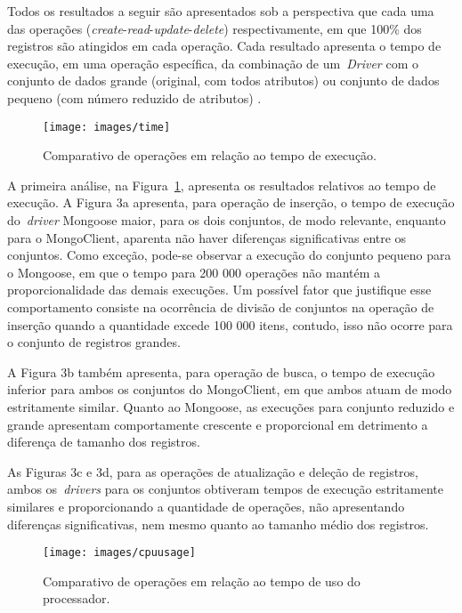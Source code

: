 \documentclass[12pt]{article}
\begin{document}
Todos os resultados a seguir são apresentados sob a perspectiva que cada uma das operações (\emph{create}-\emph{read}-\emph{update}-\emph{delete}) respectivamente, em que 100\% dos registros são atingidos em cada operação. Cada resultado apresenta o tempo de execução, em uma operação específica, da combinação de um~\emph{Driver} com o  conjunto de dados grande (original, com todos atributos) ou conjunto de dados pequeno (com número reduzido de atributos) .

\begin{figure}[!ht]
\centering
\texttt{[image: images/time]}
\caption{Comparativo de operações em relação ao tempo de execução.}
\label{fig:time}
\end{figure}

A primeira análise, na Figura~\ref{fig:time}, apresenta os resultados relativos ao tempo de execução. 
A Figura 3a apresenta, para operação de inserção, o tempo de execução do~\emph{driver} Mongoose maior, para os dois conjuntos, de modo relevante, enquanto para o MongoClient, aparenta não haver diferenças significativas entre os conjuntos. 
Como exceção, pode-se observar a execução do conjunto pequeno para o Mongoose, em que o tempo para 200 000 operações não mantém a proporcionalidade das demais execuções. Um possível fator que justifique esse comportamento consiste na ocorrência de divisão de conjuntos na operação de inserção quando a quantidade excede 100 000 itens, contudo, isso não ocorre para o conjunto de registros grandes.

A Figura 3b também apresenta, para operação de busca, o tempo de execução inferior para ambos os conjuntos do MongoClient, em que ambos atuam de modo estritamente similar. 
Quanto ao Mongoose, as execuções para conjunto reduzido e grande apresentam comportamente crescente e proporcional em detrimento a diferença de tamanho dos registros. 

As Figuras 3c e 3d, para as operações de atualização e deleção de registros, ambos os~\emph{drivers} para os conjuntos obtiveram tempos de execução estritamente similares e proporcionando a quantidade de operações, não apresentando diferenças significativas, nem mesmo quanto ao tamanho médio dos registros.

\begin{figure}[!ht]
    \centering
    \texttt{[image: images/cpuusage]}
    \caption{Comparativo de operações em relação ao tempo de uso do processador.}
    \label{fig:cpuusage}
\end{figure}
\end{document}
